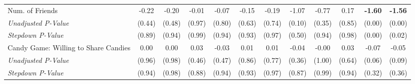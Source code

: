\begin{tabular}{l c c c c c c c c c c c}
Num. of Friends & -0.22 & -0.20 & -0.01 & -0.07 & -0.15 & -0.19 & -1.07 & -0.77 & 0.17 & \textbf{ -1.60 } & \textbf{ -1.56 } \\
\quad \textit{Unadjusted P-Value} & (0.44) & (0.48) & (0.97) & (0.80) & (0.63) & (0.74) & (0.10) & (0.35) & (0.85) & (0.00) & (0.00) \\
\quad \textit{Stepdown P-Value} & (0.89) & (0.94) & (0.99) & (0.94) & (0.93) & (0.97) & (0.50) & (0.94) & (0.98) & (0.00) & (0.02) \\
Candy Game: Willing to Share Candies & 0.00 & 0.00 & 0.03 & -0.03 & 0.01 & 0.01 & -0.04 & -0.00 & 0.03 & -0.07 & -0.05 \\
\quad \textit{Unadjusted P-Value} & (0.96) & (0.98) & (0.46) & (0.47) & (0.86) & (0.77) & (0.36) & (1.00) & (0.64) & (0.06) & (0.09) \\
\quad \textit{Stepdown P-Value} & (0.94) & (0.98) & (0.88) & (0.94) & (0.93) & (0.97) & (0.87) & (0.99) & (0.94) & (0.32) & (0.36) \\
\bottomrule
\end{tabular}
